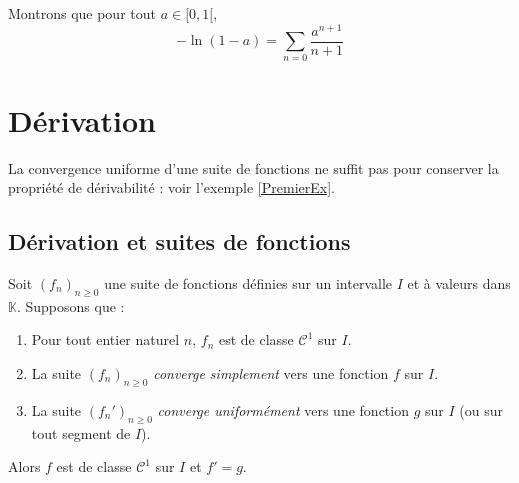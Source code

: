 \documentclass[french,11pt,twoside]{VcCours}
\newcommand{\dx}{\text{d}x}
\begin{document}
\begin{Exemple} Montrons que pour tout $a \in [0,1[$, 
$$ - \ln(1-a) = \sum_{n=0} \frac{a^{n+1}}{n+1} $$

%
\newpage

\vspace*{4cm}
\end{Exemple}

\section{Dérivation}

La convergence uniforme d'une suite de fonctions ne suffit pas pour conserver la propriété de dérivabilité : voir l'exemple \ref{PremierEx}.

\subsection{Dérivation et suites de fonctions}

\begin{Theoreme}{} Soit $(f_n)_{n \geq 0}$ une suite de fonctions définies sur un intervalle $I$ et à valeurs dans $\mathbb{K}$. Supposons que :

\begin{enumerate}
\item Pour tout entier naturel $n$, $f_n$ est de classe $\mathcal{C}^1$ sur $I$.
\item La suite $(f_n)_{n \geq 0}$ \emph{converge simplement} vers une fonction $f$ sur $I$.
\item La suite $(f_n')_{n \geq 0}$ \emph{converge uniformément} vers une fonction $g$ sur $I$ (ou sur tout segment de $I$).
\end{enumerate}
Alors $f$ est de classe $\mathcal{C}^1$ sur $I$ et $f'=g$.
\end{Theoreme}
\end{document}
